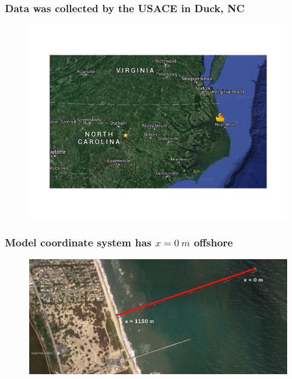 \documentclass[7pt]{beamer}
\begin{document}
    \begin{frame}
      \frametitle{Data was collected by the  USACE in Duck, NC}
      \centering
      \begin{figure}
        \includegraphics[width=1\linewidth]{img/map_ncsu_duck.png}
      \end{figure}
    \end{frame}

    \begin{frame}
      \frametitle{Model coordinate system has $x = 0~m$ offshore}
      \begin{figure}[H]
        \centering
        \includegraphics[width=1\linewidth]{img/Transect.png}
      \end{figure}
    \end{frame}
\end{document}

